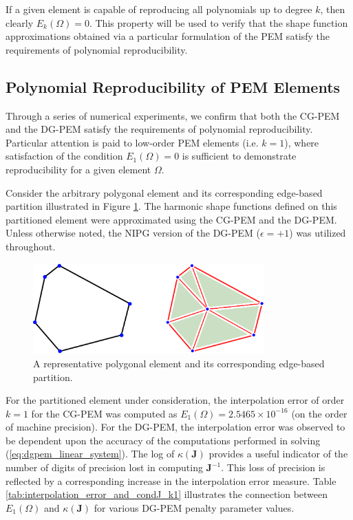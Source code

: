 If a given element is capable of reproducing all polynomials up to degree $k$, then clearly $E_k(\Omega) = 0$. This property will be used to verify that the shape function approximations obtained via a particular formulation of the PEM satisfy the requirements of polynomial reproducibility.

\subsection*{Polynomial Reproducibility of PEM Elements}

Through a series of numerical experiments, we confirm that both the CG-PEM and the DG-PEM satisfy the requirements of polynomial reproducibility. Particular attention is paid to low-order PEM elements (i.e. $k=1$), where satisfaction of the condition $E_1 (\Omega) = 0$ is sufficient to demonstrate reproducibility for a given element $\Omega$.

Consider the arbitrary polygonal element and its corresponding edge-based partition illustrated in Figure \ref{fig:reproducing_element_shape}. The harmonic shape functions defined on this partitioned element were approximated using the CG-PEM and the DG-PEM. Unless otherwise noted, the NIPG version of the DG-PEM ($\epsilon = +1$) was utilized throughout.

\begin{figure}[!h]
  \centering
  \includegraphics[width=3.5in]{figures/reproducing_element_shape.pdf}  \caption{A representative polygonal element and its corresponding edge-based partition.}
  \label{fig:reproducing_element_shape}
\end{figure}

For the partitioned element under consideration, the interpolation error of order $k=1$ for the CG-PEM was computed as $E_1 (\Omega) = 2.5465 \times 10^{-16}$ (on the order of machine precision). For the DG-PEM, the interpolation error was observed to be dependent upon the accuracy of the computations performed in solving (\ref{eq:dgpem_linear_system}). The log of $\kappa(\mathbf{J})$ provides a useful indicator of the number of digits of precision lost in computing $\mathbf{J}^{-1}$. This loss of precision is reflected by a corresponding increase in the interpolation error measure. Table \ref{tab:interpolation_error_and_condJ_k1} illustrates the connection between $E_1 (\Omega)$ and $\kappa(\mathbf{J})$ for various DG-PEM penalty parameter values. 


